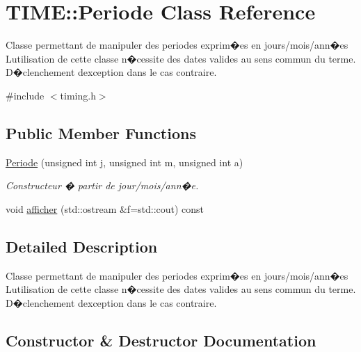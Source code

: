 \hypertarget{class_t_i_m_e_1_1_periode}{}\section{T\+I\+M\+E\+:\+:Periode Class Reference}
\label{class_t_i_m_e_1_1_periode}


Classe permettant de manipuler des periodes exprim�es en jours/mois/ann�es L\textquotesingle{}utilisation de cette classe n�cessite des dates valides au sens commun du terme. D�clenchement d\textquotesingle{}exception dans le cas contraire.  




{\ttfamily \#include $<$timing.\+h$>$}

\subsection*{Public Member Functions}
\begin{DoxyCompactItemize}
\item 
\hyperlink{class_t_i_m_e_1_1_periode_ab5de9657ef88d74ca2cdc4a49b963ba6}{Periode} (unsigned int j, unsigned int m, unsigned int a)
\begin{DoxyCompactList}\small\item\em Constructeur � partir de jour/mois/ann�e. \end{DoxyCompactList}\item 
void \hyperlink{class_t_i_m_e_1_1_periode_a0e97a115f8a2e6b503fdcb82ee1d8f08}{afficher} (std\+::ostream \&f=std\+::cout) const 
\end{DoxyCompactItemize}


\subsection{Detailed Description}
Classe permettant de manipuler des periodes exprim�es en jours/mois/ann�es L\textquotesingle{}utilisation de cette classe n�cessite des dates valides au sens commun du terme. D�clenchement d\textquotesingle{}exception dans le cas contraire. 

\subsection{Constructor \& Destructor Documentation}
\hypertarget{class_t_i_m_e_1_1_periode_ab5de9657ef88d74ca2cdc4a49b963ba6}{}
